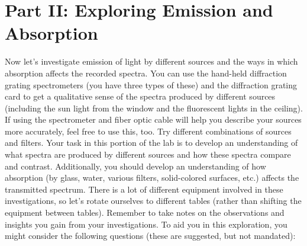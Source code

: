 \section*{Part II: Exploring Emission and Absorption}
Now let’s investigate emission of light by different sources and the ways in which absorption affects the recorded spectra. 
You can use the hand-held diffraction grating spectrometers (you have three types of these) and the diffraction grating card to get a qualitative sense of the spectra produced by different sources (including the sun light from the window and the fluorescent lights in the ceiling). 
If using the spectrometer and fiber optic cable will help you describe your sources more accurately, feel free to use this, too. 
Try different combinations of sources and filters. 
Your task in this portion of the lab is to develop an understanding of what spectra are produced by different sources and how these spectra compare and contrast. 
Additionally, you should develop an understanding of how absorption (by glass, water, various filters, solid-colored surfaces, etc.) affects the transmitted spectrum. 
There is a lot of different equipment involved in these investigations, so let's rotate ourselves to different tables (rather than shifting the equipment between tables). 
Remember to take notes on the observations and insights you gain from your investigations. 
To aid you in this exploration, you might consider the following questions (these are suggested, but not mandated):

